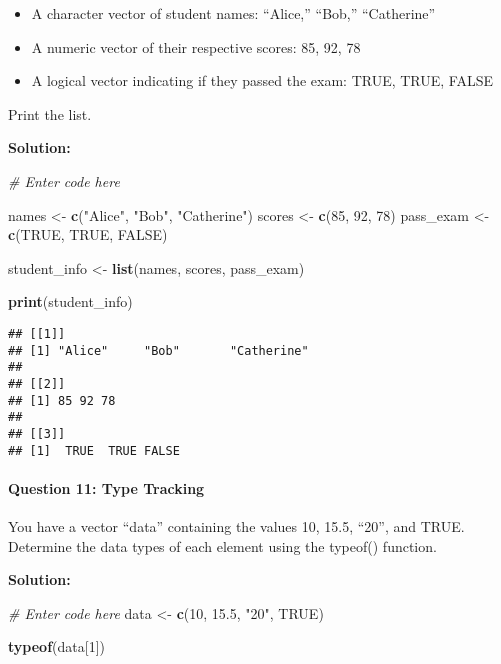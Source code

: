 \documentclass[
]{article}
\newenvironment{Shaded}{\begin{snugshade}}{\end{snugshade}}
\newcommand{\CommentTok}[1]{\textcolor[rgb]{0.56,0.35,0.01}{\textit{#1}}}
\newcommand{\ConstantTok}[1]{\textcolor[rgb]{0.56,0.35,0.01}{#1}}
\newcommand{\DecValTok}[1]{\textcolor[rgb]{0.00,0.00,0.81}{#1}}
\newcommand{\FloatTok}[1]{\textcolor[rgb]{0.00,0.00,0.81}{#1}}
\newcommand{\FunctionTok}[1]{\textcolor[rgb]{0.13,0.29,0.53}{\textbf{#1}}}
\newcommand{\NormalTok}[1]{#1}
\newcommand{\OtherTok}[1]{\textcolor[rgb]{0.56,0.35,0.01}{#1}}
\newcommand{\StringTok}[1]{\textcolor[rgb]{0.31,0.60,0.02}{#1}}
\begin{document}
\begin{itemize}
\item
  A character vector of student names: ``Alice,'' ``Bob,'' ``Catherine''
\item
  A numeric vector of their respective scores: 85, 92, 78
\item
  A logical vector indicating if they passed the exam: TRUE, TRUE, FALSE
\end{itemize}

Print the list.

\textbf{Solution:}

\begin{Shaded}
\begin{Highlighting}[]
\CommentTok{\# Enter code here}

\NormalTok{names }\OtherTok{\textless{}{-}} \FunctionTok{c}\NormalTok{(}\StringTok{"Alice"}\NormalTok{, }\StringTok{"Bob"}\NormalTok{, }\StringTok{"Catherine"}\NormalTok{)}
\NormalTok{scores }\OtherTok{\textless{}{-}} \FunctionTok{c}\NormalTok{(}\DecValTok{85}\NormalTok{, }\DecValTok{92}\NormalTok{, }\DecValTok{78}\NormalTok{)}
\NormalTok{pass\_exam }\OtherTok{\textless{}{-}} \FunctionTok{c}\NormalTok{(}\ConstantTok{TRUE}\NormalTok{, }\ConstantTok{TRUE}\NormalTok{, }\ConstantTok{FALSE}\NormalTok{)}

\NormalTok{student\_info }\OtherTok{\textless{}{-}} \FunctionTok{list}\NormalTok{(names, scores, pass\_exam)}

\FunctionTok{print}\NormalTok{(student\_info)}
\end{Highlighting}
\end{Shaded}

\begin{verbatim}
## [[1]]
## [1] "Alice"     "Bob"       "Catherine"
## 
## [[2]]
## [1] 85 92 78
## 
## [[3]]
## [1]  TRUE  TRUE FALSE
\end{verbatim}

\hypertarget{question-11-type-tracking}{%
\paragraph{Question 11: Type Tracking}\label{question-11-type-tracking}}

You have a vector ``data'' containing the values 10, 15.5, ``20'', and
TRUE. Determine the data types of each element using the typeof()
function.

\textbf{Solution:}

\begin{Shaded}
\begin{Highlighting}[]
\CommentTok{\# Enter code here}
\NormalTok{data }\OtherTok{\textless{}{-}} \FunctionTok{c}\NormalTok{(}\DecValTok{10}\NormalTok{, }\FloatTok{15.5}\NormalTok{, }\StringTok{"20"}\NormalTok{, }\ConstantTok{TRUE}\NormalTok{)}

\FunctionTok{typeof}\NormalTok{(data[}\DecValTok{1}\NormalTok{])}
\end{Highlighting}
\end{Shaded}
\end{document}
